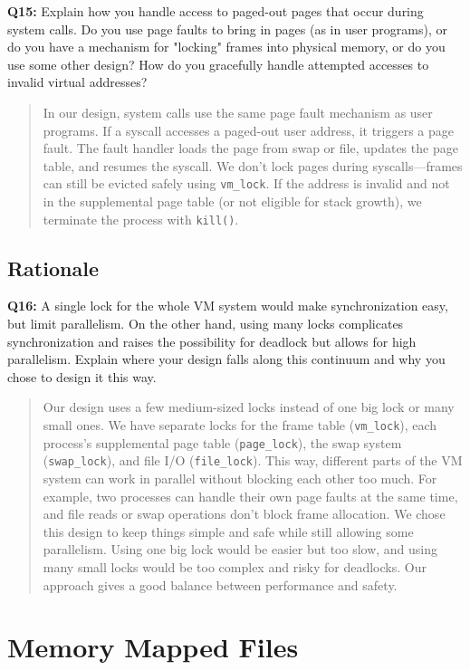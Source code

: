 \documentclass[a4paper,11pt]{paper}
\begin{document}
\textbf{Q15:} Explain how you handle access to paged-out pages that occur during system calls.  Do you use page faults to bring in pages (as in user programs), or do you have a mechanism for "locking" frames into physical memory, or do you use some other design?  How do you gracefully handle attempted accesses to invalid virtual addresses?
\begin{quote}
In our design, system calls use the same page fault mechanism as user programs. If a syscall accesses a paged-out user address, it triggers a page fault. The fault handler loads the page from swap or file, updates the page table, and resumes the syscall. We don’t lock pages during syscalls—frames can still be evicted safely using \texttt{vm\_lock}. If the address is invalid and not in the supplemental page table (or not eligible for stack growth), we terminate the process with \texttt{kill()}.
\end{quote}


\subsection{Rationale}

\textbf{Q16:} A single lock for the whole VM system would make synchronization easy, but limit parallelism.  On the other hand, using many locks complicates synchronization and raises the possibility for deadlock but allows for high parallelism.  Explain where your design falls along this continuum and why you chose to design it this way.
\begin{quote}
Our design uses a few medium-sized locks instead of one big lock or many small ones. We have separate locks for the frame table (\texttt{vm\_lock}), each process’s supplemental page table (\texttt{page\_lock}), the swap system (\texttt{swap\_lock}), and file I/O (\texttt{file\_lock}). This way, different parts of the VM system can work in parallel without blocking each other too much. For example, two processes can handle their own page faults at the same time, and file reads or swap operations don’t block frame allocation. We chose this design to keep things simple and safe while still allowing some parallelism. Using one big lock would be easier but too slow, and using many small locks would be too complex and risky for deadlocks. Our approach gives a good balance between performance and safety.
\end{quote}



\section{Memory Mapped Files}
\end{document}
